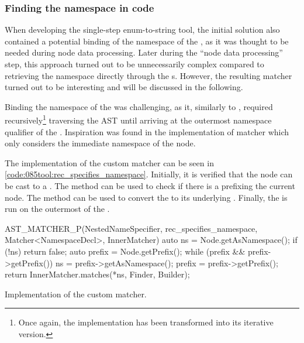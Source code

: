 \subsubsection*{Finding the namespace in code}
When developing the single-step enum-to-string tool, the initial solution also contained a potential binding of the namespace of the , as it was thought to be needed during node data processing.
Later during the ``node data processing'' step, this approach turned out to be unnecessarily complex compared to retrieving the namespace directly through the s.
However, the resulting matcher turned out to be interesting and will be discussed in the following.

Binding the namespace of the  was challenging, as it, similarly to , required recursively\footnote{
    Once again, the implementation has been transformed into its iterative version.
}
traversing the AST until arriving at the outermost namespace qualifier of the .
Inspiration was found in the implementation of  matcher which only considers the immediate namespace of the node.

The implementation of the custom matcher can be seen in \cref{code:085tool:rec_specifies_namespace}. Initially, it is verified that the node can be cast to a .
The method  can be used to check if there is a  prefixing the current node.
The method  can be used to convert the  to its underlying .
Finally, the  is run on the outermost  of the .

\begin{listing}[H]
    \begin{cppcode}
AST_MATCHER_P(NestedNameSpecifier, rec_specifies_namespace, Matcher<NamespaceDecl>, InnerMatcher) {
	auto ns = Node.getAsNamespace();
	if (!ns) {
		return false;
	}
	auto prefix = Node.getPrefix();
	while (prefix && prefix->getPrefix()) {
		ns = prefix->getAsNamespace();
		prefix = prefix->getPrefix();
	}
	return InnerMatcher.matches(*ns, Finder, Builder);
}
    \end{cppcode}
    \caption{Implementation of the  custom matcher.}
    \label{code:085tool:rec_specifies_namespace}
\end{listing}

